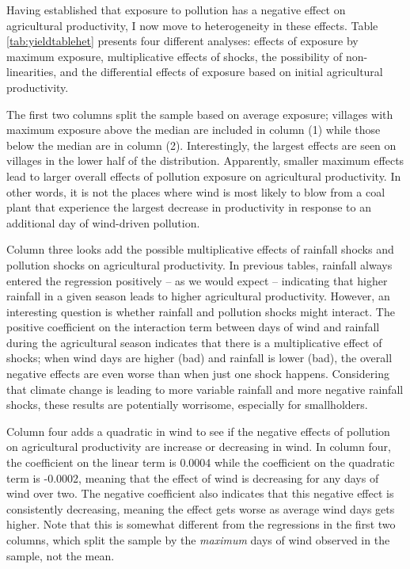 \documentclass[
]{article}
\begin{document}
Having established that exposure to pollution has a negative effect on agricultural productivity, I now move to heterogeneity in these effects. Table \ref{tab:yieldtablehet} presents four different analyses: effects of exposure by maximum exposure, multiplicative effects of shocks, the possibility of non-linearities, and the differential effects of exposure based on initial agricultural productivity.

The first two columns split the sample based on average exposure; villages with maximum exposure above the median are included in column (1) while those below the median are in column (2). Interestingly, the largest effects are seen on villages in the lower half of the distribution. Apparently, smaller maximum effects lead to larger overall effects of pollution exposure on agricultural productivity. In other words, it is not the places where wind is most likely to blow from a coal plant that experience the largest decrease in productivity in response to an additional day of wind-driven pollution.

Column three looks add the possible multiplicative effects of rainfall shocks and pollution shocks on agricultural productivity. In previous tables, rainfall always entered the regression positively -- as we would expect -- indicating that higher rainfall in a given season leads to higher agricultural productivity. However, an interesting question is whether rainfall and pollution shocks might interact. The positive coefficient on the interaction term between days of wind and rainfall during the agricultural season indicates that there is a multiplicative effect of shocks; when wind days are higher (bad) and rainfall is lower (bad), the overall negative effects are even worse than when just one shock happens. Considering that climate change is leading to more variable rainfall and more negative rainfall shocks, these results are potentially worrisome, especially for smallholders.

Column four adds a quadratic in wind to see if the negative effects of pollution on agricultural productivity are increase or decreasing in wind. In column four, the coefficient on the linear term is 0.0004 while the coefficient on the quadratic term is -0.0002, meaning that the effect of wind is decreasing for any days of wind over two. The negative coefficient also indicates that this negative effect is consistently decreasing, meaning the effect gets worse as average wind days gets higher. Note that this is somewhat different from the regressions in the first two columns, which split the sample by the \emph{maximum} days of wind observed in the sample, not the mean.
\end{document}
